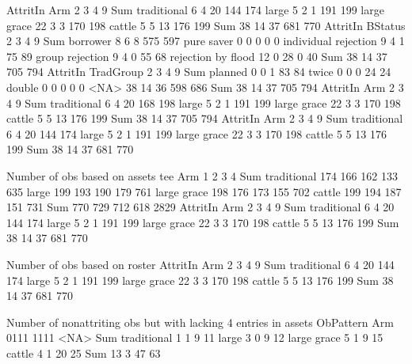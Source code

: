 \begin{Schunk}
\begin{Soutput}
             AttritIn
Arm             2   3   4   9 Sum
  traditional   6   4  20 144 174
  large         5   2   1 191 199
  large grace  22   3   3 170 198
  cattle        5   5  13 176 199
  Sum          38  14  37 681 770
                      AttritIn
BStatus                  2   3   4   9 Sum
  borrower               8   6   8 575 597
  pure saver             0   0   0   0   0
  individual rejection   9   4   1  75  89
  group rejection        9   4   0  55  68
  rejection by flood    12   0  28   0  40
  Sum                   38  14  37 705 794
         AttritIn
TradGroup   2   3   4   9 Sum
  planned   0   0   1  83  84
  twice     0   0   0  24  24
  double    0   0   0   0   0
  <NA>     38  14  36 598 686
  Sum      38  14  37 705 794
             AttritIn
Arm             2   3   4   9 Sum
  traditional   6   4  20 168 198
  large         5   2   1 191 199
  large grace  22   3   3 170 198
  cattle        5   5  13 176 199
  Sum          38  14  37 705 794
             AttritIn
Arm             2   3   4   9 Sum
  traditional   6   4  20 144 174
  large         5   2   1 191 199
  large grace  22   3   3 170 198
  cattle        5   5  13 176 199
  Sum          38  14  37 681 770


Number of obs based on assets
             tee
Arm              1    2    3    4  Sum
  traditional  174  166  162  133  635
  large        199  193  190  179  761
  large grace  198  176  173  155  702
  cattle       199  194  187  151  731
  Sum          770  729  712  618 2829
             AttritIn
Arm             2   3   4   9 Sum
  traditional   6   4  20 144 174
  large         5   2   1 191 199
  large grace  22   3   3 170 198
  cattle        5   5  13 176 199
  Sum          38  14  37 681 770


Number of obs based on roster
             AttritIn
Arm             2   3   4   9 Sum
  traditional   6   4  20 144 174
  large         5   2   1 191 199
  large grace  22   3   3 170 198
  cattle        5   5  13 176 199
  Sum          38  14  37 681 770


Number of nonattriting obs but with lacking 4 entries in assets
             ObPattern
Arm           0111 1111 <NA> Sum
  traditional    1    1    9  11
  large          3    0    9  12
  large grace    5    1    9  15
  cattle         4    1   20  25
  Sum           13    3   47  63
\end{Soutput}
\end{Schunk}




